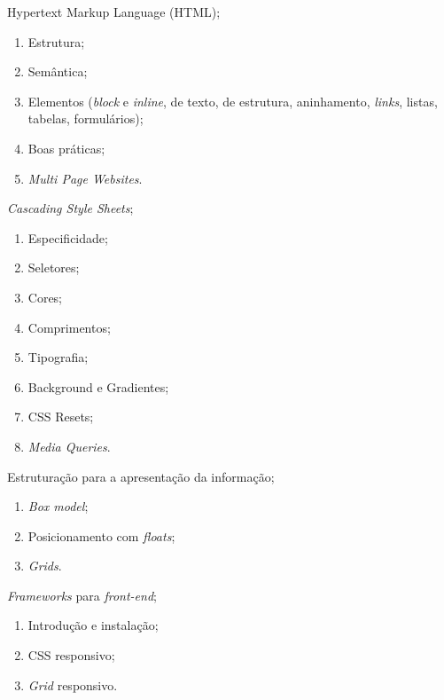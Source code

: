 \begin{pud}
\begin{description}[itemsep=0em]
\begin{enumerate}[itemsep=0em, topsep=0em]
            \end{enumerate}
        \item[UNIDADE II:] Hypertext Markup Language (HTML);
	         \begin{enumerate}[itemsep=0em, topsep=0em]
				\item Estrutura;
                \item Semântica;
                \item Elementos  (\textit{block} e \textit{inline}, de texto, de estrutura, aninhamento,  \textit{links}, listas, tabelas, formulários);
                \item Boas práticas;
				\item \textit{Multi Page Websites}.	
                
            \end{enumerate}
            
         \item[UNIDADE III:] \textit{Cascading Style Sheets};
	         \begin{enumerate}[itemsep=0em, topsep=0em]
				\item Especificidade;
				\item Seletores;
                \item  Cores;
                \item  Comprimentos;
                \item Tipografia;
                \item  Background e Gradientes;
                \item  CSS Resets;
                \item  \textit{Media Queries}.        
            \end{enumerate}
            
         \item[UNIDADE IV:] Estruturação para a apresentação da informação;
	         \begin{enumerate}[itemsep=0em, topsep=0em]
 				\item \textit{Box model};
				\item Posicionamento com \textit{floats};
				\item \textit{Grids}.         	
                
            \end{enumerate}
            
          \item[UNIDADE V:] \textit{Frameworks} para \textit{front-end};
	         \begin{enumerate}[itemsep=0em, topsep=0em]
				\item Introdução e instalação;
				\item CSS responsivo;
				\item \textit{Grid} responsivo.                
            \end{enumerate}
            

\end{description}
\end{pud}
